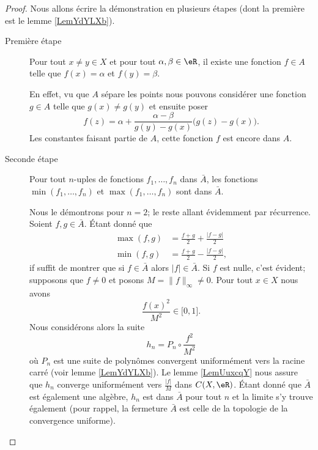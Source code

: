 \begin{proof}
    Nous allons écrire la démonstration en plusieurs étapes (dont la première est le lemme \ref{LemYdYLXb}).

    \begin{description}
        \item[Première étape] Pour tout \( x\neq y\in X\) et pour tout \( \alpha,\beta\in \eR\), il existe une fonction \( f\in A\) telle que \( f(x)=\alpha\) et \( f(y)=\beta\). 

            En effet, vu que \( A\) sépare les points nous pouvons considérer une fonction \( g\in A\) telle que \( g(x)\neq g(y)\) et ensuite poser
            \begin{equation}
                f(z)=\alpha+\frac{ \alpha-\beta }{ g(y)-g(x) }\big( g(z)-g(x) \big).
            \end{equation}
            Les constantes faisant partie de \( A\), cette fonction \( f\) est encore dans \( A\).

        \item[Seconde étape] Pour tout \( n\)-uples de fonctions \( f_1,\ldots, f_n\) dans \( \bar A\), les fonctions \( \min(f_1,\ldots, f_n)\) et \( \max(f_1,\ldots, f_n)\) sont dans \( \bar A\).

            Nous le démontrons pour \( n=2\); le reste allant évidemment par récurrence. Soient \( f,g\in \bar A\). Étant donné que
            \begin{subequations}
                \begin{align}
                    \max(f,g)&=\frac{ f+g }{2}+\frac{ | f-g | }{2}\\
                    \min(f,g)&=\frac{ f+g }{2}-\frac{ | f-g | }{2},
                \end{align}
            \end{subequations}
            if suffit de montrer que si \( f\in\bar A\) alors \( | f |\in \bar A\). Si \( f\) est nulle, c'est évident; supposons que \( f\neq 0\) et posons \( M=\| f \|_{\infty}\neq 0\). Pour tout \( x\in X\) nous avons
            \begin{equation}
                \frac{ f(x)^2 }{ M^2 }\in \mathopen[ 0 , 1 \mathclose].
            \end{equation}
            Nous considérons alors la suite
            \begin{equation}
                h_n=P_n\circ\frac{ f^2 }{ M^2 }
            \end{equation}
            où \( P_n\) est une suite de polynômes convergent uniformément vers la racine carré (voir lemme \ref{LemYdYLXb}). Le lemme \ref{LemUuxcqY} nous assure que \( h_n\) converge uniformément vers \( \frac{ | f | }{ M }\) dans \( C(X,\eR)\). Étant donné que \( \bar A\) est également une algèbre, \( h_n\) est dans \( \bar A\) pour tout \( n\) et la limite s'y trouve également (pour rappel, la fermeture \( \bar A\) est celle de la topologie de la convergence uniforme).


\end{description}
\end{proof}
